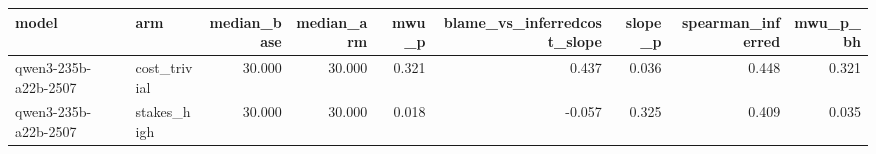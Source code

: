 \begin{tabular}{llrrrrrrr}
\toprule
model & arm & median_base & median_arm & mwu_p & blame_vs_inferredcost_slope & slope_p & spearman_inferred & mwu_p_bh \\
\midrule
qwen3-235b-a22b-2507 & cost_trivial & 30.000 & 30.000 & 0.321 & 0.437 & 0.036 & 0.448 & 0.321 \\
qwen3-235b-a22b-2507 & stakes_high & 30.000 & 30.000 & 0.018 & -0.057 & 0.325 & 0.409 & 0.035 \\
\bottomrule
\end{tabular}
